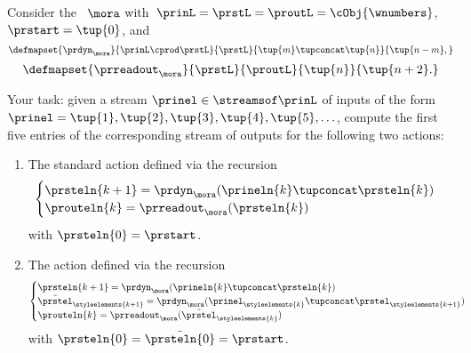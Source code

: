 \begin{gradedexercise}
    \label{ex:ComputingMooreActions}

    Consider the ~$\mora$ with~$\prinL = \prstL = \proutL = \cObj{\wnumbers}$, $\prstart = \tup{0}$, and
    \begin{equation}
        \defmapset{
            \prdyn_\mora
        }{
            \prinL \cprod \prstL
        }{
            \prstL
        }{
            \tup{m} \tupconcat \tup{n}
        }{
            \tup{n - m},
        }
    \end{equation}
    \begin{equation}
        \defmapset{
            \prreadout_\mora
        }{
            \prstL
        }{
            \proutL
        }{
            \tup{n}
        }{
            \tup{n + 2}.
        }
    \end{equation}

    Your task: given a stream $\prinel \in \streamsof \prinL$ of inputs of the form~$\prinel = \tup{1}, \tup{2}, \tup{3}, \tup{4}, \tup{5}, \ldots$, compute the first five entries of the corresponding stream of outputs for the following two actions:
    \begin{enumerate}
        \item The standard action defined via the recursion
              \begin{equation}
                  \begin{cases}
                      \prsteln{k+1} = \prdyn_\mora(\prineln{k} \tupconcat \prsteln{k}) \\
                      \prouteln{k} = \prreadout_\mora(\prsteln{k})
                  \end{cases}
              \end{equation}
              with $\prsteln{0} = \prstart$.
        \item The action defined via the recursion
              \begin{equation}
                  \begin{cases}
                      \prsteln{k+1} = \prdyn_\mora(\prineln{k} \tupconcat \prsteln{k})                                                           \\
                      \tilde{\prstel}_{\styleelements{k+1}} = \prdyn_\mora(\prinel_{\styleelements{k}} \tupconcat \prstel_{\styleelements{k+1}}) \\
                      \prouteln{k}   = \prreadout_\mora(\tilde{\prstel}_{\styleelements{k}})
                  \end{cases}
              \end{equation}
              with $\prsteln{0} = \tilde{\prsteln{0}} = \prstart$.
    \end{enumerate}
\end{gradedexercise}

